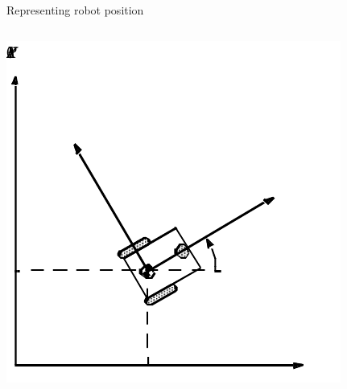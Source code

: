 \documentclass[compress]{beamer}
\begin{document}
\begin{frame}{Representing robot position}
\begin{columns}
\begin{column}{0.4\linewidth}
    \begin{center}
        \includegraphics[width=0.9\linewidth]{robot_position}
    \end{center}
        \end{column}
    \end{columns}



\end{frame}
\end{document}
